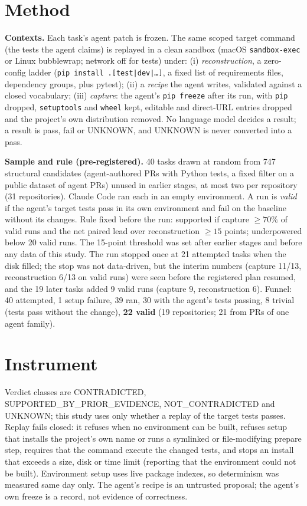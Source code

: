 \documentclass[10pt,conference]{IEEEtran}
\newcommand{\pip}{\texttt{pip freeze}}
\begin{document}
\section{Method}
\textbf{Contexts.} Each task's agent patch is frozen. The same scoped target command (the tests the agent claims) is replayed in a clean sandbox (macOS \texttt{sandbox-exec} or Linux bubblewrap; network off for tests) under: (i) \emph{reconstruction}, a zero-config ladder (\texttt{pip install .[test|dev|\dots]}, a fixed list of requirements files, dependency groups, plus pytest); (ii) a \emph{recipe} the agent writes, validated against a closed vocabulary; (iii) \emph{capture}: the agent's \pip{} after its run, with \texttt{pip} dropped, \texttt{setuptools} and \texttt{wheel} kept, editable and direct-URL entries dropped and the project's own distribution removed. No language model decides a result; a result is pass, fail or UNKNOWN, and UNKNOWN is never converted into a pass.

\textbf{Sample and rule (pre-registered).} 40 tasks drawn at random from 747 structural candidates (agent-authored PRs with Python tests, a fixed filter on a public dataset of agent PRs) unused in earlier stages, at most two per repository (31 repositories). Claude Code ran each in an empty environment. A run is \emph{valid} if the agent's target tests pass in its own environment and fail on the baseline without its changes. Rule fixed before the run: supported if capture $\ge 70\%$ of valid runs and the net paired lead over reconstruction $\ge 15$ points; underpowered below 20 valid runs. The 15-point threshold was set after earlier stages and before any data of this study.
The run stopped once at 21 attempted tasks when the disk filled; the stop was not data-driven, but the interim numbers (capture 11/13, reconstruction 6/13 on valid runs) were seen before the registered plan resumed, and the 19 later tasks added 9 valid runs (capture 9, reconstruction 6). Funnel: 40 attempted, 1 setup failure, 39 ran, 30 with the agent's tests passing, 8 trivial (tests pass without the change), \textbf{22 valid} (19 repositories; 21 from PRs of one agent family).

\section{Instrument}
Verdict classes are CONTRADICTED, SUPPORTED\_BY\_PRIOR\_EVIDENCE, NOT\_CONTRADICTED and UNKNOWN; this study uses only whether a replay of the target tests passes. Replay fails closed: it refuses when no environment can be built, refuses setup that installs the project's own name or runs a symlinked or file-modifying prepare step, requires that the command execute the changed tests, and stops an install that exceeds a size, disk or time limit (reporting that the environment could not be built). Environment setup uses live package indexes, so determinism was measured same day only. The agent's recipe is an untrusted proposal; the agent's own freeze is a record, not evidence of correctness.
\end{document}
